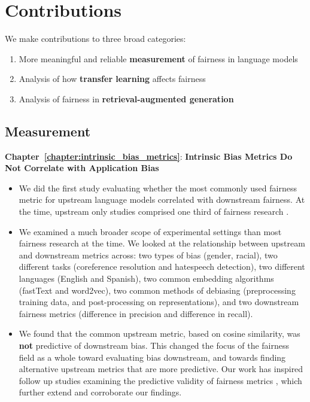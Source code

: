 \section{Contributions}
We make contributions to three broad categories: 
\begin{enumerate}
    \item More meaningful and reliable \textbf{measurement} of fairness in language models
    \item Analysis of how \textbf{transfer learning} affects fairness
    \item Analysis of fairness in \textbf{retrieval-augmented generation}    
\end{enumerate}

\subsection{Measurement} 
\textbf{Chapter~\ref{chapter:intrinsic_bias_metrics}}: \textbf{Intrinsic Bias Metrics Do Not Correlate with Application Bias}
\begin{itemize}
    \item We did the first study evaluating whether the most commonly used fairness metric for upstream language models correlated with downstream fairness. At the time, upstream only studies comprised one third of fairness research \citep{blodgett-etal-2020-language}.
    \item We examined a much broader scope of experimental settings than most fairness research at the time. We looked at the relationship between upstream and downstream metrics across: two types of bias (gender, racial), two different tasks (coreference resolution and hatespeech detection), two different languages (English and Spanish), two common embedding algorithms (fastText and word2vec), two common methods of debiasing (preprocessing training data, and post-processing on representations), and two downstream fairness metrics (difference in precision and difference in recall). 
    \item We found that the common upstream metric, based on cosine similarity, was \textbf{not} predictive of downstream bias. This changed the focus of the fairness field as a whole toward evaluating bias downstream, and towards finding alternative upstream metrics that are more predictive. Our work has inspired follow up studies examining the predictive validity of fairness metrics \citep{cao-etal-2022-intrinsic, others?}, which further extend and corroborate our findings. 
 \end{itemize}

